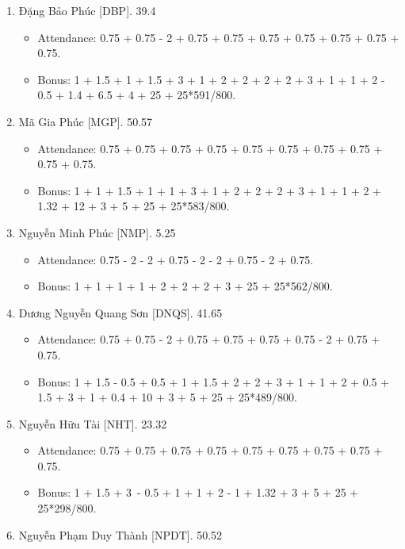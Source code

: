 \documentclass{article}
\begin{document}
\begin{enumerate}
\begin{itemize}
        \item Bonus: 1 + 1 + 1.5 + 1 + 1.5 + 3 + 1 + 2 + 2 + 2 + 2 + 3 + 2 + 2 + 2 + 14 + 3 + 5 + 25 + 25*307/800.
    \end{itemize}
    \item {\sc Đặng Bảo Phúc [DBP].} 39.4
    \begin{itemize}
        \item Attendance: 0.75 + 0.75 - 2 + 0.75 + 0.75 + 0.75 + 0.75 + 0.75 + 0.75 + 0.75.
        \item Bonus: 1 + 1.5 + 1 + 1.5 + 3 + 1 + 2 + 2 + 2 + 2 + 3 + 1 + 1 + 2 - 0.5 + 1.4 + 6.5 + 4 + 25 + 25*591/800.
    \end{itemize}
    \item {\sc Mã Gia Phúc [MGP].} 50.57
    \begin{itemize}
        \item Attendance: 0.75 + 0.75 + 0.75 + 0.75 + 0.75 + 0.75 + 0.75 + 0.75 + 0.75 + 0.75.
        \item Bonus: 1 + 1 + 1.5 + 1 + 1 + 3 + 1 + 2 + 2 + 2 + 3 + 1 + 1 + 2 + 1.32 + 12 + 3 + 5 + 25 + 25*583/800.
    \end{itemize}
    \item {\sc Nguyễn Minh Phúc [NMP].} 5.25
    \begin{itemize}
        \item Attendance: 0.75 - 2 - 2 + 0.75 - 2 - 2 + 0.75 - 2 + 0.75.
        \item Bonus: 1 + 1 + 1 + 1 + 2 + 2 + 2 + 3 + 25 + 25*562/800.
    \end{itemize}
    \item {\sc Dương Nguyễn Quang Sơn [DNQS].} 41.65
    \begin{itemize}
        \item Attendance: 0.75 + 0.75 - 2 + 0.75 + 0.75 + 0.75 + 0.75 - 2 + 0.75 + 0.75.
        \item Bonus: 1 + 1.5 - 0.5 + 0.5 + 1 + 1.5 + 2 + 2 + 3 + 1 + 1 + 2 + 0.5 + 1.5 + 3 + 1 + 0.4 + 10 + 3 + 5 + 25 + 25*489/800.
    \end{itemize}
    \item {\sc Nguyễn Hữu Tài [NHT].} 23.32
    \begin{itemize}
        \item Attendance: 0.75 + 0.75 + 0.75 + 0.75 + 0.75 + 0.75 + 0.75 + 0.75 + 0.75.
        \item Bonus: 1 + 1.5 + 3 - 0.5 + 1 + 1 + 2 - 1 + 1.32 + 3 + 5 + 25 + 25*298/800.
    \end{itemize}
    \item {\sc Nguyễn Phạm Duy Thành [NPDT].} 50.52

\end{enumerate}
\end{document}
